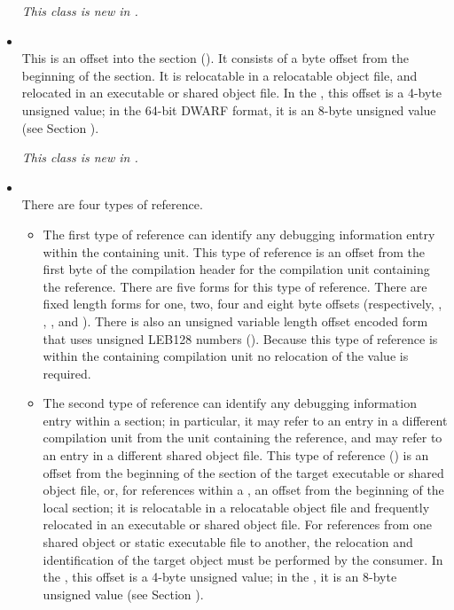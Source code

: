 \begin{itemize}
\textit{This class is new in \DWARFVersionV.}

\item \CLASSrnglistsptr \\
This is an offset
into the \dotdebugrnglists{} section (\DWFORMsecoffset). 
It consists of a byte offset from the beginning of the 
\dotdebugrnglists{} section.
It is relocatable in a relocatable object file, and relocated 
in an executable or shared object file.
In the \thirtytwobitdwarfformat, this offset
is a 4-byte unsigned value; in the 64-bit DWARF
format, it is an 8-byte unsigned value (see Section
).

\textit{This class is new in \DWARFVersionV.}

\item \CLASSreference \\
There are four types of reference.
\begin{itemize}
\item
The first type of reference can identify any debugging
information entry within the containing unit. 
This type of reference is an 
offset
from the first byte of the compilation
header for the compilation unit containing the reference. There
are five forms for this type of reference. There are fixed
length forms for one, two, four and eight byte offsets
(respectively,
\DWFORMrefnMARK 
\DWFORMrefoneTARG, 
\DWFORMreftwoTARG, 
\DWFORMreffourTARG,
and \DWFORMrefeightTARG). 
There is also an unsigned variable
length offset encoded form that uses 
unsigned LEB128 numbers
(\DWFORMrefudataTARG). 
Because this type of reference is within
the containing compilation unit no relocation of the value
is required.

\item
The second type of reference can identify any debugging
information entry within a 
\dotdebuginfo{} section; in particular,
it may refer to an entry in a different compilation unit
from the unit containing the reference, and may refer to an
entry in a different shared object file.  This type of reference
(\DWFORMrefaddrTARG) 
is an offset from the beginning of the
\dotdebuginfo{} 
section of the target executable or shared object file, or, for
references within a , 
an offset from the beginning of the local \dotdebuginfo{} section;
it is relocatable in a relocatable object file and frequently
relocated in an executable or shared object file. For
references from one shared object or static executable file
to another, the relocation and identification of the target
object must be performed by the consumer. In the 
\thirtytwobitdwarfformat, this offset is a 4-byte unsigned value; 
in the \sixtyfourbitdwarfformat, it is an 8-byte
unsigned value 
(see Section ).


\end{itemize}
\end{itemize}
